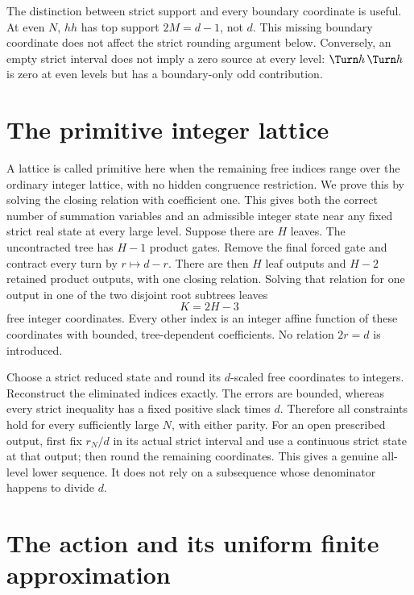 The distinction between strict support and every boundary coordinate is useful. At even $N$, $hh$ has top support $2M=d-1$, not $d$. This missing boundary coordinate does not affect the strict rounding argument below. Conversely, an empty strict interval does not imply a zero source at every level: $\Turn h\,\Turn h$ is zero at even levels but has a boundary-only odd contribution.

\section{The primitive integer lattice}

A lattice is called primitive here when the remaining free indices range over the ordinary integer lattice, with no hidden congruence restriction. We prove this by solving the closing relation with coefficient one. This gives both the correct number of summation variables and an admissible integer state near any fixed strict real state at every large level.
Suppose there are $H$ leaves. The uncontracted tree has $H-1$ product gates. Remove the final forced gate and contract every turn by $r\mapsto d-r$. There are then $H$ leaf outputs and $H-2$ retained product outputs, with one closing relation. Solving that relation for one output in one of the two disjoint root subtrees leaves
\begin{equation}\label{eq:lattice-dimension}
 K=2H-3
\end{equation}
free integer coordinates. Every other index is an integer affine function of these coordinates with bounded, tree-dependent coefficients. No relation $2r=d$ is introduced.

Choose a strict reduced state and round its $d$-scaled free coordinates to integers. Reconstruct the eliminated indices exactly. The errors are bounded, whereas every strict inequality has a fixed positive slack times $d$. Therefore all constraints hold for every sufficiently large $N$, with either parity. For an open prescribed output, first fix $r_N/d$ in its actual strict interval and use a continuous strict state at that output; then round the remaining coordinates. This gives a genuine all-level lower sequence. It does not rely on a subsequence whose denominator happens to divide $d$.

\section{The action and its uniform finite approximation}

